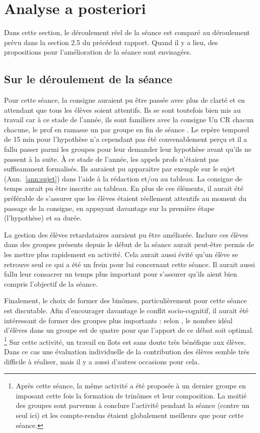 \documentclass[12pt,a4paper, fleqn]{article}
\begin{document}
\section{Analyse a posteriori}

Dans cette section, le déroulement réel de la séance est comparé au déroulement prévu dans la section 2.5 du précédent rapport.
Quand il y a lieu, des propositions pour l'amélioration de la séance sont envisagées.

\subsection{Sur le déroulement de la séance}

Pour cette séance, la consigne auraient pu être passée avec plus de clarté et en attendant que tous les élèves soient attentifs.
Ils se sont toutefois bien mis au travail car à ce stade de l'année, ils sont familiers avec la consigne \og Un CR chacun chacune, le prof en ramasse un par groupe en fin de séance \fg{}.
Le repère temporel de 15 min pour l'hypothèse n'a cependant pas été convenablement perçu et il a fallu passer parmi les groupes pour leur demander leur hypothèse avant qu'ils ne passent à la suite.
À ce stade de l'année, les appels profs n'étaient pas suffisamment formalisés.
Ils auraient pu apparaitre par exemple sur le sujet (Ann.~\ref{ann:sujet}) dans l'aide à la rédaction et/ou au tableau.
La consigne de temps aurait pu être inscrite au tableau.
En plus de ces éléments, il aurait été préférable de s'assurer que les élèves étaient réellement attentifs au moment du passage de la consigne, en appuyant davantage sur la première étape (l'hypothèse) et sa durée.

La gestion des élèves retardataires auraient pu être améliorée.
Inclure ces élèves dans des groupes présents depuis le début de la séance aurait peut-être permis de les mettre plus rapidement en activité.
Cela aurait aussi évité qu'un élève se retrouve seul ce qui a été un frein pour lui concernant cette séance.
Il aurait aussi fallu leur consacrer un temps plus important pour s'assurer qu'ils aient bien compris l'objectif de la séance.

Finalement, le choix de former des binômes, particulièrement pour cette séance est discutable.
Afin d'encourager davantage le conflit socio-cognitif, il aurait été intéressant de former des groupes plus importants : selon \cite{Courtillot2006}, le nombre idéal d'élèves dans un groupe est de quatre pour que l'apport de ce débat soit optimal.
\footnote{Après cette séance, la même activité a été proposée à un dernier groupe en imposant cette fois la formation de trinômes et leur composition.
La moitié des groupes sont parvenus à conclure l'activité pendant la séance (contre un seul ici) et les compte-rendus étaient globalement meilleurs que pour cette séance.}
Sur cette activité, un travail en îlots est sans doute très bénéfique aux élèves.
Dans ce cas une évaluation individuelle de la contribution des élèves semble très difficile à réaliser, mais il y a aussi d'autres occasions pour cela.
\end{document}
